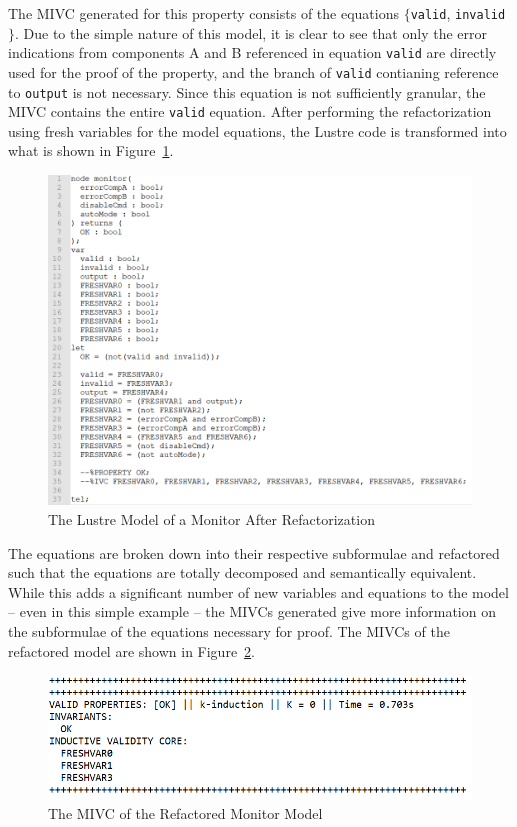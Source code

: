 The MIVC generated for this property consists of the equations $\{$\texttt{valid}, \texttt{invalid}$\}$. Due to the simple nature of this model, it is clear to see that only the error indications from components A and B referenced in equation \texttt{valid} are directly used for the proof of the property, and the branch of \texttt{valid} contianing reference to \texttt{output} is not necessary. Since this equation is not sufficiently granular, the MIVC contains the entire \texttt{valid} equation. After performing the refactorization using fresh variables for the model equations, the Lustre code is transformed into what is shown in Figure~\ref{fig:monitorFreshLustre}. 
\begin{figure}[h!]
\begin{center}
\includegraphics[width=.7\textwidth]{images/monitorFreshLustre.PNG}
\caption{The Lustre Model of a Monitor After Refactorization} \label{fig:monitorFreshLustre}
\end{center}
\end{figure} 

The equations are broken down into their respective subformulae and refactored such that the equations are totally decomposed and semantically equivalent. While this adds a significant number of new variables and equations to the model -- even in this simple example -- the MIVCs generated give more information on the subformulae of the equations necessary for proof. The MIVCs of the refactored model are shown in Figure~\ref{fig:monitorFreshIVCs}. 
\begin{figure}[h!]
\begin{center}
\includegraphics[width=.6\textwidth]{images/monitorFreshIVCs.PNG}
\caption{The MIVC of the Refactored Monitor Model} \label{fig:monitorFreshIVCs}
\end{center}
\end{figure} 

